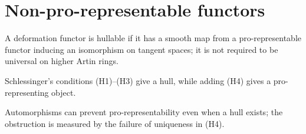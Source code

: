 \section{Non-pro-representable functors}
\begin{definition}\label{fga-def-6-3-1}
A deformation functor is hullable if it has a smooth map from a pro-representable
functor inducing an isomorphism on tangent spaces; it is not required to be
universal on higher Artin rings.
\end{definition}
\begin{theorem}\label{fga-thm-6-3-4}
Schlessinger's conditions (H1)--(H3) give a hull, while adding (H4) gives a
pro-representing object.
\end{theorem}
\begin{corollary}\label{fga-cor-6-3-5}
Automorphisms can prevent pro-representability even when a hull exists; the
obstruction is measured by the failure of uniqueness in (H4).
\end{corollary}

